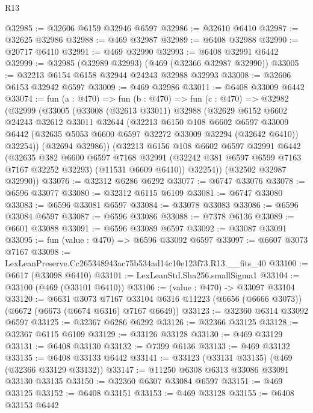 \begin{lexlean}{R13}
\begin{coremodule}
@32985 := @32606 @6159 @32946 @6597
@32986 := @32610 @6410
@32987 := @32625 @32986
@32988 := @469 @32987
@32989 := @6408 @32988
@32990 := @20717 @6410
@32991 := @469 @32990
@32993 := @6408 @32991 @6442
@32999 := @32985 (@32989 @32993) (@469 (@32366 @32987 @32990))
@33005 := @32213 @6154 @6158 @32944 @24243 @32988 @32993
@33008 := @32606 @6153 @32942 @6597
@33009 := @469 @32986
@33011 := @6408 @33009 @6442
@33074 := fun (a : @470) =>
  fun (b : @470) =>
  fun (c : @470) =>
  @32982
    (@32999
      (@33005
        (@33008
          (@32613 @33011)
          @32988
          (@32629
            @6152
            @6602
            @24243
            @32612
            @33011
            @32644
            (@32213
              @6150
              @108
              @6602
              @6597
              @33009
              @6442
              (@32635 @5053 @6600 @6597 @32272 @33009 @32294 (@32642 @6410))
              @32254))
          (@32694 @32986))
        (@32213
          @6156
          @108
          @6602
          @6597
          @32991
          @6442
          (@32635
            @382
            @6600
            @6597
            @7168
            @32991
            (@32242 @381 @6597 @6599 @7163 @7167 @32252 @32293)
            (@11531 @6609 @6410))
          @32254))
      (@32502 @32987 @32990))
@33076 := @32312 @6286 @6292
@33077 := @6747 @33076
@33078 := @6596 @33077
@33080 := @32312 @6115 @6109
@33081 := @6747 @33080
@33083 := @6596 @33081 @6597
@33084 := @33078 @33083
@33086 := @6596 @33084 @6597
@33087 := @6596 @33086
@33088 := @7378 @6136
@33089 := @6601 @33088
@33091 := @6596 @33089 @6597
@33092 := @33087 @33091
@33095 := fun (value : @470) => @6596 @33092 @6597
@33097 := @6607 @3073 @7167
@33098 := LexLeanPreserve.Cc265348943ac75b534ad14c10e123f73.R13.__fits_40
@33100 := @6617 (@33098 @6410)
@33101 := LexLeanStd.Sha256.smallSigma1
@33104 := @33100 (@469 (@33101 @6410))
@33106 := (value : @470) -> @33097 @33104
@33120 := @6631
    @3073
    @7167
    @33104
    @6316
    @11223
    (@6656 (@6666 @3073))
    (@6672 (@6673 (@6674 @6316) @7167 @6649))
@33123 := @32360 @6314 @33092 @6597
@33125 := @32367 @6286 @6292
@33126 := @32366 @33125
@33128 := @32367 @6115 @6109
@33129 := @33126 @33128
@33130 := @469 @33129
@33131 := @6408 @33130
@33132 := @7399 @6136
@33133 := @469 @33132
@33135 := @6408 @33133 @6442
@33141 := @33123 (@33131 @33135) (@469 (@32366 @33129 @33132))
@33147 := @11250 @6308 @6313 @33086 @33091 @33130 @33135
@33150 := @32360 @6307 @33084 @6597
@33151 := @469 @33125
@33152 := @6408 @33151
@33153 := @469 @33128
@33155 := @6408 @33153 @6442

\end{coremodule}
\end{lexlean}
